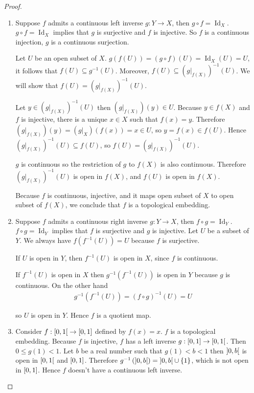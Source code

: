 \begin{proof}
	\begin{enumerate}[label={(\alph*)}]
		\item Suppose $f$ admits a continuous left inverse $g: Y \to X$, then $g\circ f = \operatorname{Id}_{X}$. $g\circ f = \operatorname{Id}_{X}$ implies that $g$ is surjective and $f$ is injective. So $f$ is a continuous injection, $g$ is a continuous surjection.

		      Let $U$ be an open subset of $X$. $g(f(U)) = (g\circ f)(U) = \operatorname{Id}_{X}(U) = U$, it follows that $f(U) \subseteq g^{-1}(U)$. Moreover, $f(U) \subseteq {(g\vert_{f(X)})}^{-1}(U)$. We will show that $f(U) = {(g\vert_{f(X)})}^{-1}(U)$.

		      Let $y\in {(g\vert_{f(X)})}^{-1}(U)$ then $(g\vert_{f(X)})(y) \in U$. Because $y\in f(X)$ and $f$ is injective, there is a unique $x\in X$ such that $f(x) = y$. Therefore $(g\vert_{f(X)})(y) = (g\vert_{X})(f(x)) = x \in U$, so $y = f(x) \in f(U)$. Hence ${(g\vert_{f(X)})}^{-1}(U) \subseteq f(U)$, so $f(U) = {(g\vert_{f(X)})}^{-1}(U)$.

		      $g$ is continuous so the restriction of $g$ to $f(X)$ is also continuous. Therefore ${(g\vert_{f(X)})}^{-1}(U)$ is open in $f(X)$, and $f(U)$ is open in $f(X)$.

		      Because $f$ is continuous, injective, and it maps open subset of $X$ to open subset of $f(X)$, we conclude that $f$ is a topological embedding.
		\item Suppose $f$ admits a continuous right inverse $g: Y\to X$, then $f\circ g = \operatorname{Id}_{Y}$. $f\circ g = \operatorname{Id}_{Y}$ implies that $f$ is surjective and $g$ is injective. Let $U$ be a subset of $Y$. We always have $f(f^{-1}(U)) = U$ because $f$ is surjective.

		      If $U$ is open in $Y$, then $f^{-1}(U)$ is open in $X$, since $f$ is continuous.

		      If $f^{-1}(U)$ is open in $X$ then $g^{-1}(f^{-1}(U))$ is open in $Y$ because $g$ is continuous. On the other hand
		      \begin{align*}
			      g^{-1}(f^{-1}(U)) = {(f \circ g)}^{-1}(U) = U
		      \end{align*}

		      so $U$ is open in $Y$. Hence $f$ is a quotient map.
		\item Consider $f: \left[{0, 1}\right[ \to \left[{0, 1}\right]$ defined by $f(x) = x$. $f$ is a topological embedding. Because $f$ is injective, $f$ has a left inverse $g: \left[{0, 1}\right] \to \left[{0, 1}\right[$. Then $0\leq g(1) < 1$. Let $b$ be a real number such that $g(1) < b < 1$ then $\left]{0, b}\right[$ is open in $\left[{0, 1}\right[$ and $\left[{0, 1}\right]$. Therefore $g^{-1}\left(\left]{0, b}\right[\right) = \left]{0, b}\right[ \cup \{ 1 \}$, which is not open in $\left[{0, 1}\right]$. Hence $f$ doesn't have a continuous left inverse.


\end{enumerate}
\end{proof}
